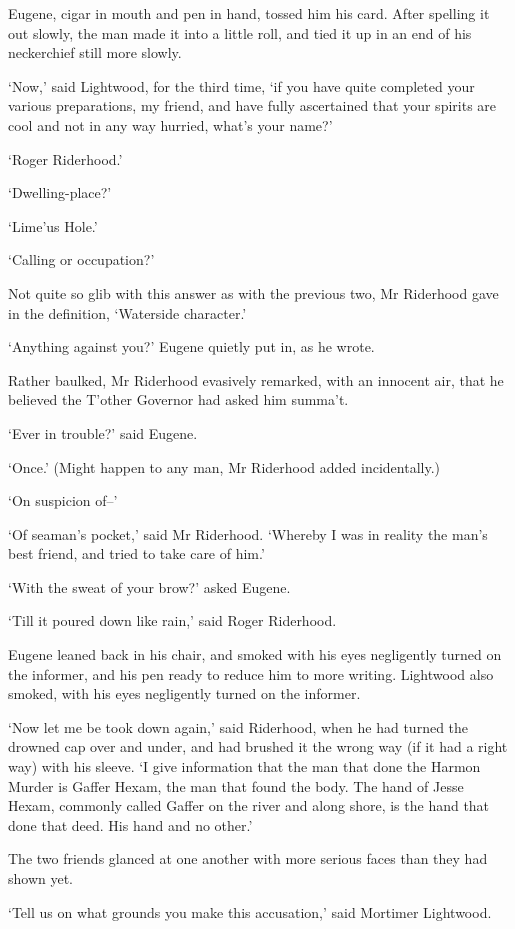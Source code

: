 Eugene, cigar in mouth and pen in hand, tossed him his card. After
spelling it out slowly, the man made it into a little roll, and tied it
up in an end of his neckerchief still more slowly.

‘Now,’ said Lightwood, for the third time, ‘if you have quite completed
your various preparations, my friend, and have fully ascertained that
your spirits are cool and not in any way hurried, what’s your name?’

‘Roger Riderhood.’

‘Dwelling-place?’

‘Lime’us Hole.’

‘Calling or occupation?’

Not quite so glib with this answer as with the previous two, Mr
Riderhood gave in the definition, ‘Waterside character.’

‘Anything against you?’ Eugene quietly put in, as he wrote.

Rather baulked, Mr Riderhood evasively remarked, with an innocent air,
that he believed the T’other Governor had asked him summa’t.

‘Ever in trouble?’ said Eugene.

‘Once.’ (Might happen to any man, Mr Riderhood added incidentally.)

‘On suspicion of--’

‘Of seaman’s pocket,’ said Mr Riderhood. ‘Whereby I was in reality the
man’s best friend, and tried to take care of him.’

‘With the sweat of your brow?’ asked Eugene.

‘Till it poured down like rain,’ said Roger Riderhood.

Eugene leaned back in his chair, and smoked with his eyes negligently
turned on the informer, and his pen ready to reduce him to more writing.
Lightwood also smoked, with his eyes negligently turned on the informer.

‘Now let me be took down again,’ said Riderhood, when he had turned the
drowned cap over and under, and had brushed it the wrong way (if it had
a right way) with his sleeve. ‘I give information that the man that done
the Harmon Murder is Gaffer Hexam, the man that found the body. The hand
of Jesse Hexam, commonly called Gaffer on the river and along shore, is
the hand that done that deed. His hand and no other.’

The two friends glanced at one another with more serious faces than they
had shown yet.

‘Tell us on what grounds you make this accusation,’ said Mortimer
Lightwood.


